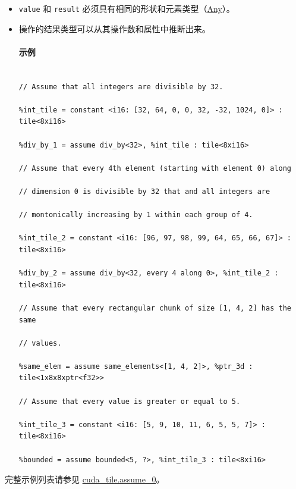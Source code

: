 \documentclass{article}
\begin{document}
\begin{itemize}
\item \texttt{value} 和 \texttt{result} 必须具有相同的形状和元素类型（\href{https://docs.nvidia.com/cuda/tile-ir/latest/sections/operations.html#type-any}{Any}）。
\item 操作的结果类型可以从其操作数和属性中推断出来。




\paragraph{示例}


\begin{lstlisting}

// Assume that all integers are divisible by 32.

%int_tile = constant <i16: [32, 64, 0, 0, 32, -32, 1024, 0]> : tile<8xi16>

%div_by_1 = assume div_by<32>, %int_tile : tile<8xi16>

// Assume that every 4th element (starting with element 0) along

// dimension 0 is divisible by 32 that and all integers are

// montonically increasing by 1 within each group of 4.

%int_tile_2 = constant <i16: [96, 97, 98, 99, 64, 65, 66, 67]> : tile<8xi16>

%div_by_2 = assume div_by<32, every 4 along 0>, %int_tile_2 : tile<8xi16>

// Assume that every rectangular chunk of size [1, 4, 2] has the same

// values.

%same_elem = assume same_elements<[1, 4, 2]>, %ptr_3d : tile<1x8x8xptr<f32>>

// Assume that every value is greater or equal to 5.

%int_tile_3 = constant <i16: [5, 9, 10, 11, 6, 5, 5, 7]> : tile<8xi16>

%bounded = assume bounded<5, ?>, %int_tile_3 : tile<8xi16>

\end{lstlisting}



\end{itemize}
完整示例列表请参见 \href{https://docs.nvidia.com/cuda/tile-ir/latest/sections/appendix.html#example-cuda-tile-assume-0}{cuda\_tile.assume\_0}。
\end{document}
